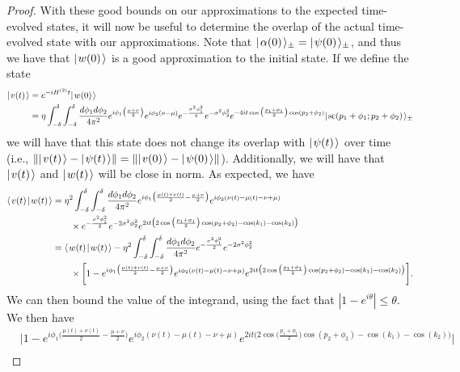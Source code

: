 \documentclass[../thesis-main/thesis-main]{subfiles}
\begin{document}
\begin{proof}
With these good bounds on our approximations to the expected time-evolved states, it will now be useful to determine the overlap of the actual time-evolved state with our approximations.  Note that $|\mspace{2mu} \alpha(0) \mspace{2mu} \rangle_{\pm} = |\mspace{2mu} \psi(0) \mspace{2mu} \rangle_{\pm}$, and thus we have that $|\mspace{2mu} w(0) \mspace{2mu} \rangle$ is a good approximation to the initial state.  If we define the state
\begin{align}
  |\mspace{2mu} v(t) \mspace{2mu} \rangle &= e^{-i H^{(2)}t} |\mspace{2mu} w(0) \mspace{2mu} \rangle \\
  &= \eta \int_{-\delta}^\delta \int_{-\delta}^\delta \frac{d\phi_1 d\phi_2}{4\pi^2} e^{i \phi_1 \big(\frac{\mu + \nu}{2}\big)} e^{i  \phi_2 (\nu - \mu)} e^{ -\frac{ \sigma^2 \phi_1^2}{4}} e^{ -\sigma^2 \phi_2^2} e^{- 4 i t \cos\big(\frac{p_1+\phi_1}{2}\big)\cos(p_2+\phi_2)} |\mspace{2mu} \text{sc}(p_1 + \phi_1; p_2 + \phi_2) \mspace{2mu} \rangle_{\pm}
\end{align}
we will have that this state does not change its overlap with $|\mspace{2mu} \psi(t) \mspace{2mu} \rangle$ over time (i.e., $\|{|\mspace{2mu} v(t) \mspace{2mu} \rangle - |\mspace{2mu} \psi(t) \mspace{2mu} \rangle}\| = \|{|\mspace{2mu} v(0) \mspace{2mu} \rangle - |\mspace{2mu} \psi(0) \mspace{2mu} \rangle}\|$).  Additionally, we will have that $|\mspace{2mu} v(t) \mspace{2mu} \rangle$ and $|\mspace{2mu} w(t) \mspace{2mu} \rangle$ will be close in norm.  As expected, we have
\begin{align}
   \langle\mspace{2mu} v(t) \mspace{2mu} | \mspace{2mu} w(t)\mspace{2mu} \rangle &= \eta^2 \int_{-\delta}^\delta \int_{-\delta}^\delta \frac{d\phi_1 d\phi_2}{4\pi^2} e^{i \phi_1 \big(\frac{\mu(t) + \nu(t)}{2} - \frac{\mu +\nu}{2} \big)} e^{i  \phi_2 (\nu(t) - \mu(t) -\nu + \mu)} \nonumber\\
   & \qquad \times e^{ -\frac{ \sigma^2 \phi_1^2}{2}} e^{ -2\sigma^2 \phi_2^2} e^{ 2 i t\big( 2 \cos\big(\frac{p_1+\phi_1}{2}\big)\cos(p_2+\phi_2) - \cos(k_1) - \cos(k_2)\big)} \\
   & = \langle\mspace{2mu} w(t) \mspace{2mu} | \mspace{2mu} w(t)\mspace{2mu} \rangle - \eta^2 \int_{-\delta}^\delta \int_{-\delta}^\delta \frac{d\phi_1 d\phi_2}{4\pi^2}  e^{ -\frac{ \sigma^2 \phi_1^2}{2}} e^{ -2\sigma^2 \phi_2^2}\nonumber\\
   & \qquad \times \bigg[ 1 - e^{i \phi_1 \big(\frac{\mu(t) + \nu(t)}{2} - \frac{\mu +\nu}{2} \big)} e^{i  \phi_2 (\nu(t) - \mu(t) -\nu + \mu)}e^{ 2 i t\big( 2 \cos\big(\frac{p_1+\phi_1}{2}\big)\cos(p_2+\phi_2) - \cos(k_1) - \cos(k_2)\big)}\bigg] .
\end{align}
We can then bound the value of the integrand, using the fact that $|1 - e^{i\theta}| \leq \theta$.  We then have
\begin{align}
  &\bigg| 1 - e^{i \phi_1 \big(\frac{\mu(t) + \nu(t)}{2} - \frac{\mu +\nu}{2} \big)} e^{i  \phi_2 (\nu(t) - \mu(t) -\nu + \mu)}e^{ 2 i t\big( 2 \cos\big(\frac{p_1+\phi_1}{2}\big)\cos(p_2+\phi_2) - \cos(k_1) - \cos(k_2)\big)}\bigg|\nonumber\\

\end{align}
\end{proof}
\end{document}
